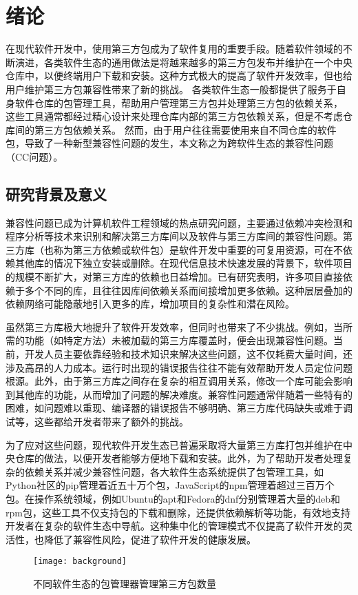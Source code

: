 \chapter{绪论}
在现代软件开发中，使用第三方包成为了软件复用的重要手段。随着软件领域的不断演进，各类软件生态的通用做法是将越来越多的第三方包发布并维护在一个中央仓库中，以便终端用户下载和安装。这种方式极大的提高了软件开发效率，但也给用户维护第三方包兼容性带来了新的挑战。
各类软件生态一般都提供了服务于自身软件仓库的包管理工具，帮助用户管理第三方包并处理第三方包的依赖关系，
这些工具通常都经过精心设计来处理仓库内部的第三方包依赖关系，但是不考虑仓库间的第三方包依赖关系。
然而，由于用户往往需要使用来自不同仓库的软件包，导致了一种新型兼容性问题的发生，本文称之为跨软件生态的兼容性问题（CC问题）。

\section{研究背景及意义}
兼容性问题已成为计算机软件工程领域的热点研究问题，主要通过依赖冲突检测和程序分析等技术来识别和解决第三方库间以及软件与第三方库间的兼容性问题。第三方库（也称为第三方依赖或软件包）是软件开发中重要的可复用资源，可在不依赖其他库的情况下独立安装或删除。在现代信息技术快速发展的背景下，软件项目的规模不断扩大，对第三方库的依赖也日益增加。已有研究表明，许多项目直接依赖于多个不同的库，且往往因库间依赖关系而间接增加更多依赖。这种层层叠加的依赖网络可能隐蔽地引入更多的库，增加项目的复杂性和潜在风险。

虽然第三方库极大地提升了软件开发效率，但同时也带来了不少挑战。例如，当所需的功能（如特定方法）未被加载的第三方库覆盖时，便会出现兼容性问题。当前，开发人员主要依靠经验和技术知识来解决这些问题，这不仅耗费大量时间，还涉及高昂的人力成本。运行时出现的错误报告往往不能有效帮助开发人员定位问题根源。此外，由于第三方库之间存在复杂的相互调用关系，修改一个库可能会影响到其他库的功能，从而增加了问题的解决难度。兼容性问题通常伴随着一些特有的困难，如问题难以重现、编译器的错误报告不够明确、第三方库代码缺失或难于调试等，这些都给开发者带来了额外的挑战。

为了应对这些问题，现代软件开发生态已普遍采取将大量第三方库打包并维护在中央仓库的做法，以便开发者能够方便地下载和安装。此外，为了帮助开发者处理复杂的依赖关系并减少兼容性问题，各大软件生态系统提供了包管理工具，如Python社区的pip管理着近五十万个包，JavaScript的npm管理着超过三百万个包。在操作系统领域，例如Ubuntu的apt和Fedora的dnf分别管理着大量的deb和rpm包，这些工具不仅支持包的下载和删除，还提供依赖解析等功能，有效地支持开发者在复杂的软件生态中导航。这种集中化的管理模式不仅提高了软件开发的灵活性，也降低了兼容性风险，促进了软件开发的健康发展。
\begin{figure}[t]
	\centering
	\texttt{[image: background]}
	\caption{不同软件生态的包管理器管理第三方包数量}
	\label{fig:bac}
\end{figure}

